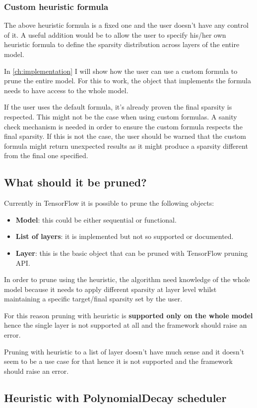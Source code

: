 \subsubsection{Custom heuristic formula}
The above heuristic formula is a fixed one and the user doesn't have any
control of it. A useful addition would be to allow the user to specify his/her
own heuristic formula to define the sparsity distribution across layers of the
entire model.

In \autoref{ch:implementation} I will show how the user can use a custom
formula to prune the entire model. For this to work, the object that implements
the formula needs to have access to the whole model.

If the user uses the default formula, it's already proven the final sparsity is
respected. This might not be the case when using custom formulas.
A sanity check mechanism is needed in order to ensure the custom formula
respects the final sparsity. If this is not the case, the user should be warned
that the custom formula might return unexpected results as it might produce a
sparsity different from the final one specified.

\subsection{What should it be pruned?}
Currently in TensorFlow it is possible to prune the following objects:
\begin{itemize}
    \item \textbf{Model}: this could be either sequential or functional.
    \item \textbf{List of layers}: it is implemented but not so supported or
        documented.
    \item \textbf{Layer}: this is the basic object that can be pruned with
        TensorFlow pruning API\@.
\end{itemize}

In order to prune using the heuristic, the algorithm need knowledge of the
whole model because it needs to apply different sparsity at layer level whilst
maintaining a specific target/final sparsity set by the user.

For this reason pruning with heuristic is \textbf{supported only on the whole
model} hence the single layer is not supported at all and the framework should
raise an error.

Pruning with heuristic to a list of layer doesn't have much sense and it
doesn't seem to be a use case for that hence it is not supported and the
framework should raise an error.

\subsection{Heuristic with PolynomialDecay scheduler}
\lipsum[1]
